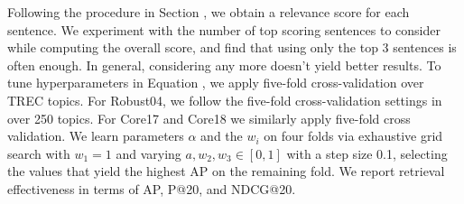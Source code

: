 Following the procedure in Section , we obtain a relevance score for each sentence.
We experiment with the number of top scoring sentences to consider while computing the overall score, and find that using only the top 3 sentences is often enough.
In general, considering any more doesn't yield better results.
To tune hyperparameters in Equation , we apply five-fold cross-validation over TREC topics.
For Robust04, we follow the five-fold cross-validation settings in~\cite{lin2019neural} over 250 topics.
For Core17 and Core18 we similarly apply five-fold cross validation.
We learn parameters $\alpha$ and the $w_i$ on four folds via exhaustive grid search with $ w_1 = 1 $ and varying $ a, w_2, w_3 \in [0, 1] $ with a step size 0.1, selecting the values that yield the highest AP on the remaining fold.
We report retrieval effectiveness in terms of AP, P@20, and NDCG@20.
